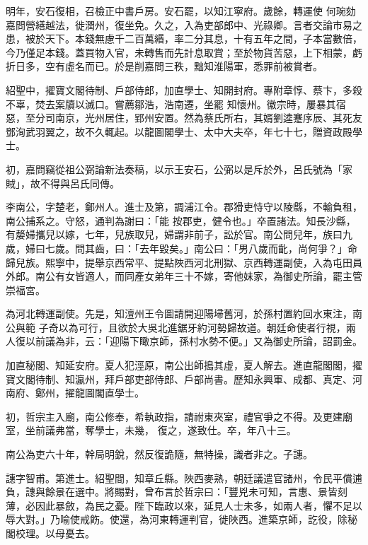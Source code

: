 \begin{pinyinscope}
 明年，安石復相，召檢正中書戶房。安石罷，以知江寧府。歲餘，轉運使
 何琬劾嘉問營繕越法，徙潤州，復坐免。久之，入為吏部郎中、光祿卿。言者交論市易之患，被於天下。本錢無慮千二百萬緡，率二分其息，十有五年之間，子本當數倍，今乃僅足本錢。蓋買物入官，未轉售而先計息取賞；至於物貨苦惡，上下相蒙，虧折日多，空有虛名而已。於是削嘉問三秩，黜知淮陽軍，悉罪前被賞者。



 紹聖中，擢寶文閣待制、戶部侍郎，加直學士、知開封府。專附章惇、蔡卞，多殺不辜，焚去案牘以滅口。嘗薦鄒浩，浩南遷，坐罷
 知懷州。徽宗時，屢暴其宿惡，至分司南京，光州居住，郢州安置。然為蔡氏所右，其婿劉逵蹇序辰、其死友鄧洵武羽翼之，故不久輒起。以龍圖閣學士、太中大夫卒，年七十七，贈資政殿學士。



 初，嘉問竊從祖公弼論新法奏稿，以示王安石，公弼以是斥於外，呂氏號為「家賊」，故不得與呂氏同傳。



 李南公，字楚老，鄭州人。進士及第，調浦江令。郡猾吏恃守以陵縣，不輸負租，南公捕系之。守怒，通判為謝曰：「能
 按郡吏，健令也。」卒置諸法。知長沙縣，有嫠婦攜兒以嫁，七年，兒族取兒，婦謂非前子，訟於官。南公問兒年，族曰九歲，婦曰七歲。問其齒，曰：「去年毀矣。」南公曰：「男八歲而齔，尚何爭？」命歸兒族。熙寧中，提舉京西常平、提點陜西河北刑獄、京西轉運副使，入為屯田員外郎。南公有女皆適人，而同產女弟年三十不嫁，寄他妹家，為御史所論，罷主管崇福宮。



 為河北轉運副使。先是，知澶州王令圖請開迎陽埽舊河，於孫村置約回水東注，南公與範
 子奇以為可行，且欲於大吳北進鋸牙約河勢歸故道。朝廷命使者行視，兩人復以前議為非，云：「迎陽下瞰京師，孫村水勢不便。」又為御史所論，詔罰金。



 加直秘閣、知延安府。夏人犯涇原，南公出師搗其虛，夏人解去。進直龍閣閣，擢寶文閣待制、知瀛州，拜戶部吏部侍郎、戶部尚書。歷知永興軍、成都、真定、河南府、鄭州，擢龍圖閣直學士。



 初，哲宗主入廟，南公修奉，希執政指，請祔東夾室，禮官爭之不得。及更建廟室，坐前議弗當，奪學士，未幾，
 復之，遂致仕。卒，年八十三。



 南公為吏六十年，幹局明銳，然反復詭隨，無特操，識者非之。子譓。



 譓字智甫。第進士。紹聖間，知章丘縣。陜西麥熟，朝廷議遣官諸州，令民平償逋負，譓與餘景在選中。將賜對，曾布言於哲宗曰：「豐兇未可知，言惠、景皆刻薄，必因此暴斂，為民之憂。陛下臨政以來，延見人士未多，如兩人者，懼不足以辱大對。」乃喻使戒飭。使還，為河東轉運判官，徙陜西。進築京師，訖役，除秘閣校理。以母憂去。




\end{pinyinscope}
